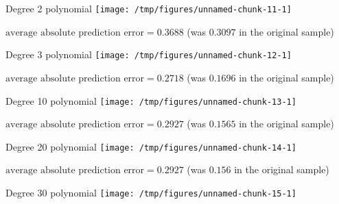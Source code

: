 \documentclass{beamer}\usepackage[]{graphicx}\usepackage[]{color}
\makeatletter
\def\maxwidth{ %
  \ifdim\Gin@nat@width>\linewidth
    \linewidth
  \else
    \Gin@nat@width
  \fi
}
\newenvironment{knitrout}{}{} %
\makeatother
\begin{document}
\begin{darkframes}
    \begin{frame}{Degree 2 polynomial}
\begin{knitrout}
\color{fgcolor}
\texttt{[image: /tmp/figures/unnamed-chunk-11-1]} 

\end{knitrout}
      \vspace{-1cm} $\text{average absolute prediction error} = 0.3688$
      (was $0.3097$ in the original sample)
    \end{frame}

    \begin{frame}{Degree 3 polynomial}
\begin{knitrout}
\color{fgcolor}
\texttt{[image: /tmp/figures/unnamed-chunk-12-1]} 

\end{knitrout}
      \vspace{-1cm} $\text{average absolute prediction error} = 0.2718$
      (was $0.1696$ in the original sample)
    \end{frame}

    \begin{frame}{Degree 10 polynomial}
\begin{knitrout}
\color{fgcolor}
\texttt{[image: /tmp/figures/unnamed-chunk-13-1]} 

\end{knitrout}
      \vspace{-1cm} $\text{average absolute prediction error} = 0.2927$
      (was $0.1565$ in the original sample)
    \end{frame}

    \begin{frame}{Degree 20 polynomial}
\begin{knitrout}
\color{fgcolor}
\texttt{[image: /tmp/figures/unnamed-chunk-14-1]} 

\end{knitrout}
      \vspace{-1cm} $\text{average absolute prediction error} = 0.2927$
      (was $0.156$ in the original sample)
    \end{frame}

    \begin{frame}{Degree 30 polynomial}
\begin{knitrout}
\color{fgcolor}
\texttt{[image: /tmp/figures/unnamed-chunk-15-1]} 


\end{knitrout}
\end{frame}
\end{darkframes}
\end{document}
